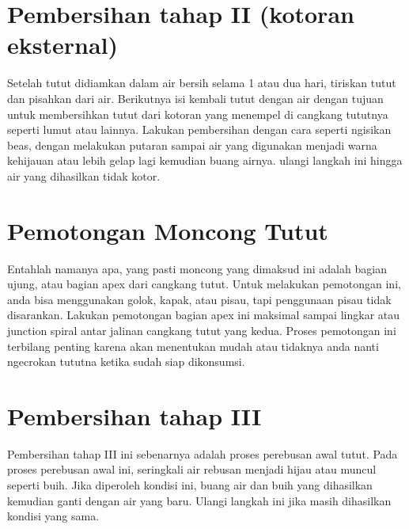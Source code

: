 \documentclass[a4paper]{article}
\begin{document}
\begin{multicols}{2}
\section{Pembersihan tahap II (kotoran eksternal)}
Setelah tutut didiamkan dalam air bersih selama 1 atau dua hari, tiriskan tutut dan pisahkan dari air. Berikutnya isi kembali tutut dengan air dengan tujuan untuk membersihkan tutut dari kotoran yang menempel di cangkang tututnya seperti lumut atau lainnya. Lakukan pembersihan dengan cara seperti ngisikan beas, dengan melakukan putaran sampai air yang digunakan menjadi warna kehijauan atau lebih gelap lagi kemudian buang airnya. ulangi langkah ini hingga air yang dihasilkan tidak kotor.

\section{Pemotongan Moncong Tutut}
Entahlah namanya apa, yang pasti moncong yang dimaksud ini adalah bagian ujung, atau bagian apex dari cangkang tutut. Untuk melakukan pemotongan ini, anda bisa menggunakan golok, kapak, atau pisau, tapi penggunaan pisau tidak disarankan. Lakukan pemotongan bagian apex ini maksimal sampai lingkar atau junction spiral  antar jalinan cangkang tutut yang kedua. Proses pemotongan ini terbilang penting karena akan menentukan mudah atau tidaknya anda nanti ngecrokan tututna ketika sudah siap dikonsumsi.

\section{Pembersihan tahap III}
Pembersihan tahap III ini sebenarnya adalah proses perebusan awal tutut. Pada proses perebusan awal ini, seringkali air rebusan menjadi hijau atau muncul seperti buih. Jika diperoleh kondisi ini, buang air dan buih yang dihasilkan kemudian ganti dengan air yang baru. Ulangi langkah ini jika masih dihasilkan kondisi yang sama.


\end{multicols}
\end{document}
